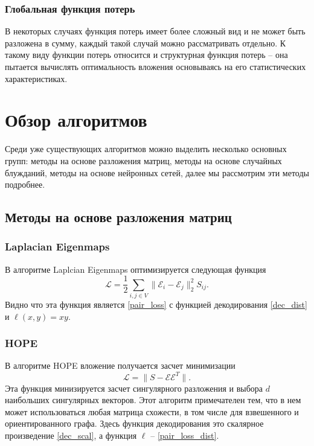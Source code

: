 \documentclass[12pt,a4paper]{extarticle}
\newcommand{\E}{\mathcal{E}}
\newcommand{\Loss}{\mathcal{L}}
\begin{document}
    \subsubsection{Глобальная функция потерь}
    В некоторых случаях функция потерь имеет более сложный вид и не может быть разложена в сумму, каждый такой случай можно рассматривать отдельно. К такому виду функции потерь относится и структурная функция потерь -- она пытается вычислять оптимальность вложения основываясь на его статистических характеристиках.

    \section{Обзор алгоритмов}
    Среди уже существующих алгоритмов можно выделить несколько основных групп: методы на основе разложения матриц, методы на основе случайных блужданий, методы на основе нейронных сетей, далее мы рассмотрим эти методы подробнее.
    \subsection{Методы на основе разложения матриц}
    \subsubsection{Laplacian Eigenmaps \cite{laplacianeigenmaps}}
    В алгоритме Laplcian Eigenmaps оптимизируется следующая функция
    \begin{equation} \label{lapl_loss}
        \Loss = \frac{1}{2} \sum_{i, j \in V} \lVert \E_i - \E_j \rVert_2 ^ 2 S_{ij}.
    \end{equation}
    Видно что эта функция является \eqref{pair_loss} с функцией декодирования \eqref{dec_dist} и $\ell(x, y) = xy$.
    
    
    \subsubsection{HOPE \cite{HOPE}}
    
    В алгоритме HOPE вложение получается засчет минимизации
    \[
    \Loss = \lVert S - \E \E^T \rVert.
    \]
    Эта функция минизируется засчет сингулярного разложения и выбора $d$ наибольших сингулярных векторов. Этот алгоритм примечателен тем, что в нем может использоваться любая матрица схожести, в том числе для взвешенного и ориентированного графа.
    Здесь функция декодирования это скалярное произведение \eqref{dec_scal}, а функция $\ell$ -- \eqref{pair_loss_dist}.
    
\end{document}
